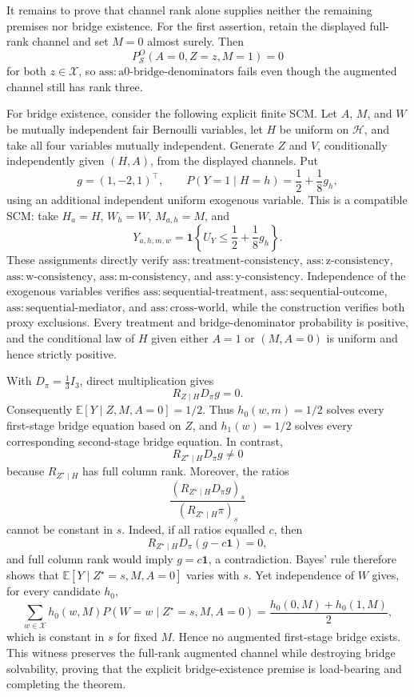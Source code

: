 It remains to prove that channel rank alone supplies neither the remaining premises nor bridge existence. For the first assertion, retain the displayed full-rank channel and set \(M=0\) almost surely. Then
\[
 P_{\mathcal S}^O(A=0,Z=z,M=1)=0
\]
for both \(z\in\mathcal X\), so \(\mathrm{ass{:}a0\text{-}bridge\text{-}denominators}\) fails even though the augmented channel still has rank three.

For bridge existence, consider the following explicit finite SCM. Let \(A\), \(M\), and \(W\) be mutually independent fair Bernoulli variables, let \(H\) be uniform on \(\mathcal H\), and take all four variables mutually independent. Generate \(Z\) and \(V\), conditionally independently given \((H,A)\), from the displayed channels. Put
\[
 g=(1,-2,1)^{\top},
 \qquad
 P(Y=1\mid H=h)=\frac12+\frac18g_h,
\]
using an additional independent uniform exogenous variable. This is a compatible SCM: take \(H_a=H\), \(W_h=W\), \(M_{a,h}=M\), and
\[
 Y_{a,h,m,w}=\mathbf 1\!\left\{U_Y\le\frac12+\frac18g_h\right\}.
\]
These assignments directly verify \(\mathrm{ass{:}treatment\text{-}consistency}\), \(\mathrm{ass{:}z\text{-}consistency}\), \(\mathrm{ass{:}w\text{-}consistency}\), \(\mathrm{ass{:}m\text{-}consistency}\), and \(\mathrm{ass{:}y\text{-}consistency}\). Independence of the exogenous variables verifies \(\mathrm{ass{:}sequential\text{-}treatment}\), \(\mathrm{ass{:}sequential\text{-}outcome}\), \(\mathrm{ass{:}sequential\text{-}mediator}\), and \(\mathrm{ass{:}cross\text{-}world}\), while the construction verifies both proxy exclusions. Every treatment and bridge-denominator probability is positive, and the conditional law of \(H\) given either \(A=1\) or \((M,A=0)\) is uniform and hence strictly positive.

With \(D_\pi=\frac13I_3\), direct multiplication gives
\[
 R_{Z\mid H}D_\pi g=0.
\]
Consequently \(\mathbb E[Y\mid Z,M,A=0]=1/2\). Thus \(h_0(w,m)=1/2\) solves every first-stage bridge equation based on \(Z\), and \(h_1(w)=1/2\) solves every corresponding second-stage bridge equation. In contrast,
\[
 R_{Z^{\star}\mid H}D_\pi g\ne0
\]
because \(R_{Z^{\star}\mid H}\) has full column rank. Moreover, the ratios
\[
 \frac{(R_{Z^{\star}\mid H}D_\pi g)_s}
 {(R_{Z^{\star}\mid H}\pi)_s}
\]
cannot be constant in \(s\). Indeed, if all ratios equalled \(c\), then
\[
 R_{Z^{\star}\mid H}D_\pi(g-c\mathbf 1)=0,
\]
and full column rank would imply \(g=c\mathbf 1\), a contradiction. Bayes' rule therefore shows that \(\mathbb E[Y\mid Z^{\star}=s,M,A=0]\) varies with \(s\). Yet independence of \(W\) gives, for every candidate \(h_0\),
\[
 \sum_{w\in\mathcal X}h_0(w,M)P(W=w\mid Z^{\star}=s,M,A=0)
 =\frac{h_0(0,M)+h_0(1,M)}{2},
\]
which is constant in \(s\) for fixed \(M\). Hence no augmented first-stage bridge exists. This witness preserves the full-rank augmented channel while destroying bridge solvability, proving that the explicit bridge-existence premise is load-bearing and completing the theorem.